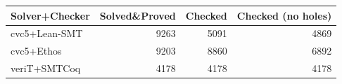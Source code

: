 \begin{tabular}{lrrr}
    \toprule
    Solver+Checker & Solved\&Proved & Checked & Checked (no holes) \\
    \midrule
    cvc5+Lean-SMT  & 9263           & 5091    & 4869               \\
    cvc5+Ethos     & 9203           & 8860    & 6892               \\
    veriT+SMTCoq   & 4178           & 4178    & 4178               \\
    \bottomrule
\end{tabular}
